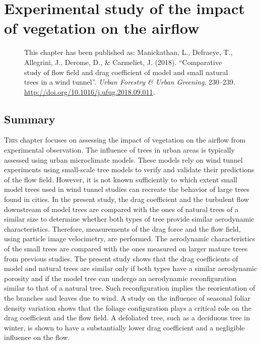 \chapter{Experimental study of the impact of vegetation on the airflow}
\label{ch:paper2}

\def\figdir{chapters/ch03_experimentalstudymodels/figures}

\begin{figure}[h]
	\centering
	\begin{minipage}{0.9\textwidth}
		\textsf{ \footnotesize This chapter has been published as: Manickathan, L., Defraeye, T., Allegrini, J., Derome, D., \& Carmeliet, J. (2018). ``Comparative study of flow field and drag coefficient of model and small natural trees in a wind tunnel''. \textit{Urban Forestry \& Urban Greening}, 230–239. \url{http://doi.org/10.1016/j.ufug.2018.09.011}.}
	\end{minipage}
\end{figure}
\vspace{2em}

\section{Summary}

\lettrine[lines=3,nindent=0em,loversize=0.1]{T}{his} chapter focuses on assessing the impact of vegetation on the airflow from experimental observation. The influence of trees in urban areas is typically assessed using urban microclimate models. These models rely on wind tunnel experiments using small-scale tree models to verify and validate their predictions of the flow field. However, it is not known sufficiently to which extent small model trees used in wind tunnel studies can recreate the behavior of large trees found in cities. In the present study, the drag coefficient and the turbulent flow downstream of model trees are compared with the ones of natural trees of a similar size to determine whether both types of tree provide similar aerodynamic characteristics. Therefore, measurements of the drag force and the flow field, using particle image velocimetry, are performed. The aerodynamic characteristics of the small trees are compared with the ones measured on larger mature trees from previous studies. The present study shows that the drag coefficients of model and natural trees are similar only if both types have a similar aerodynamic porosity and if the model tree can undergo an aerodynamic reconfiguration similar to that of a natural tree. Such reconfiguration implies the reorientation of the branches and leaves due to wind. A study on the influence of seasonal foliar density variation shows that the foliage configuration plays a critical role on the drag coefficient and the flow field. A defoliated tree, such as a deciduous tree in winter, is shown to have a substantially lower drag coefficient and a negligible influence on the flow.

